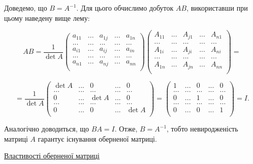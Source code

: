 Доведемо, що $B = A^{-1}$. Для цього обчислимо добуток $A B$, використавши при
цьому наведену вище лему:

$$AB = \dfrac{1}{\det A} \begin{pmatrix}
	a_{11} & ... & a_{1j} & ... & a_{1n} \\
	...    & ... & ...    & ... & ...    \\
	a_{i1} & ... & a_{ij} & ... & a_{in} \\
	...    & ... & ...    & ... & ...    \\
	a_{n1} & ... & a_{nj} & ... & a_{nn} \\ 
\end{pmatrix}    \begin{pmatrix}
	A_{11} & ... & A_{j1} & ... & A_{n1} \\
	...    & ... & ...    & ... & ...    \\
	A_{1i} & ... & A_{ji} & ... & A_{ni} \\
	...    & ... & ...    & ... & ...    \\
	A_{1n} & ... & A_{jn} & ... & A_{nn} \\ 
\end{pmatrix} = $$

$$= \dfrac{1}{\det A} \begin{pmatrix}
	\det A & ... & 0      & ... & 0      \\
	...    & ... & ...    & ... & ...    \\
	0      & ... & \det A & ... & 0      \\
	...    & ... & ...    & ... & ...    \\
	0      & ... & 0      & ... & \det A \\ 
\end{pmatrix}
= \begin{pmatrix}
	1      & ... & 0      & ... & 0      \\
	...    & ... & ...    & ... & ...    \\
	0      & ... & 1      & ... & 0      \\
	...    & ... & ...    & ... & ...    \\
	0      & ... & 0      & ... & 1      \\ 
\end{pmatrix}
= I.$$


Аналогічно доводиться, що $B A = I$. Отже, $B = A^{-1}$, тобто невиродженість
матриці $A$ гарантує існування оберненої матриці.


\underline{Властивості оберненої матриці}

